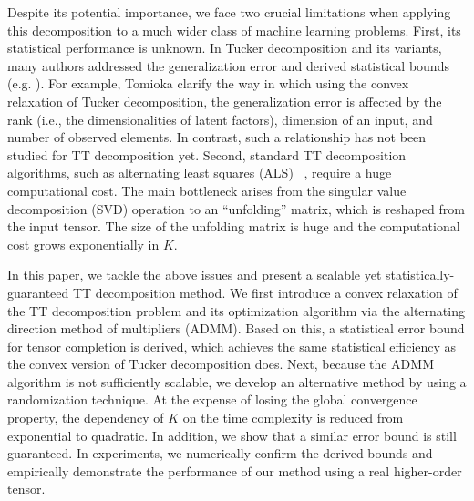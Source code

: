 Despite its potential importance, we face two crucial limitations when
applying this decomposition to a much wider class of machine learning problems.
%
First, its statistical performance is unknown. In Tucker decomposition
and its variants, many authors addressed the generalization error and
derived statistical bounds
(e.g. \cite{tomioka2011statistical,tomioka2013convex}). For example,
Tomioka \etal \cite{tomioka2011statistical} clarify the way in which using the convex
relaxation of Tucker decomposition, the generalization error is
affected by the rank (i.e., the dimensionalities of latent factors),
 dimension of an input, and number of observed elements. In
contrast, such a relationship has not been studied for TT decomposition
yet.
%
Second, standard TT decomposition algorithms, such as alternating
least squares (ALS)~\cite{grasedyck2015alternating,wang2016tensor} ,
require a huge computational cost. The main bottleneck arises from the
singular value decomposition (SVD) operation to an ``unfolding''
matrix, which is reshaped from the input tensor. The size of the
unfolding matrix is huge and the computational cost grows
exponentially in $K$. 


In this paper, we tackle the above issues and present a scalable yet
statistically-guaranteed TT decomposition method. We first introduce a
convex relaxation of the TT decomposition problem and its optimization
algorithm via the alternating direction method of multipliers (ADMM).
Based on this, a statistical error bound for tensor completion is
derived, which achieves the same statistical efficiency as the convex
version of Tucker decomposition does. Next, because the ADMM algorithm
is not sufficiently scalable, we develop an alternative method by using a
randomization technique. At the expense of losing the global
convergence property, the dependency of $K$ on the time complexity is
reduced from exponential to quadratic. In addition, we show that a
similar error bound is still guaranteed.
%
In experiments, we numerically confirm the derived bounds and
empirically demonstrate the performance of our method using a real
higher-order tensor.





